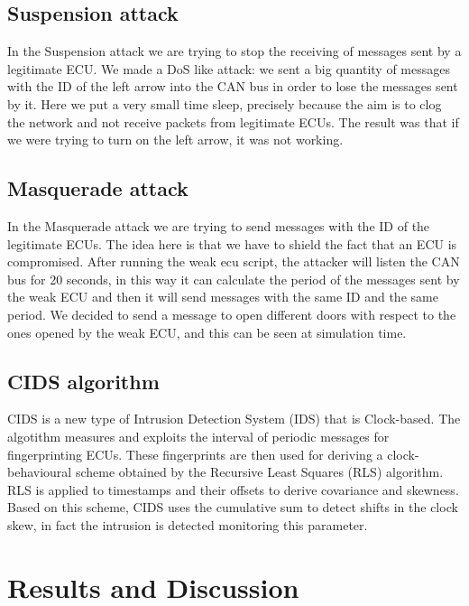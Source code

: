 \documentclass[12pt]{article}
\begin{document}
\subsection{Suspension attack}
In the Suspension attack we are trying to stop the receiving of messages sent by a legitimate ECU. We made a DoS like attack: we sent a big quantity of messages with the ID of the left arrow into the CAN bus in order to lose the messages sent by it. Here we put a very small time sleep, precisely because the aim is to clog the network and not receive packets from legitimate ECUs. The result was that if we were trying to turn on the left arrow, it was not working.
\subsection{Masquerade attack}
In the Masquerade attack we are trying to send messages with the ID of the legitimate ECUs. The idea here is that we have to shield the fact that an ECU is compromised. After running the weak ecu script, the attacker will listen the CAN bus for 20 seconds, in this way it can calculate the period of the messages sent by the weak ECU and then it will send messages with the same ID and the same period. We decided to send a message to open different doors with respect to the ones opened by the weak ECU, and this can be seen at simulation time.
\subsection{CIDS algorithm}
CIDS is a new type of Intrusion Detection System (IDS) that is Clock-based. The algotithm measures and exploits the interval of periodic messages for fingerprinting ECUs. These fingerprints are then used for deriving a clock-behavioural scheme obtained by the Recursive Least Squares (RLS) algorithm. RLS is applied to timestamps and their offsets to derive covariance and skewness. Based on this scheme, CIDS uses the cumulative sum to detect shifts in the clock skew, in fact the intrusion is detected monitoring this parameter. 
\section{Results and Discussion}
\printbibliography 
\end{document}
